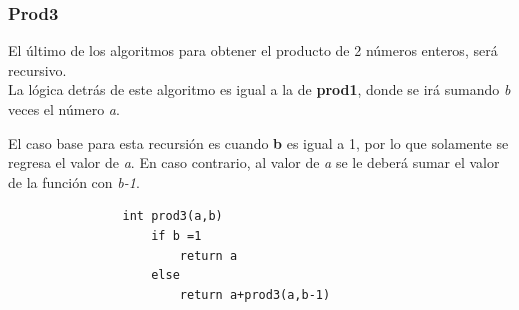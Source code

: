 \documentclass{report}
\begin{document}
        \subsubsection*{Prod3}
            El último de los algoritmos para obtener el producto de 2 números enteros, ser\'a recursivo.\\
            
            La lógica detrás de este algoritmo es igual a la de \textbf{prod1}, donde se irá sumando \textit{b} veces el número \textit{a}. 
            
            El caso base para esta recursión es cuando \textbf{b} es igual a 1, por lo que solamente se regresa el valor de \textit{a}. En caso contrario, al valor de \textit{a} se le deberá sumar el valor de la función con \textit{b-1}.
            \begin{verbatim}
                int prod3(a,b)
                    if b =1
                        return a
                    else
                        return a+prod3(a,b-1)
            \end{verbatim}
\end{document}
